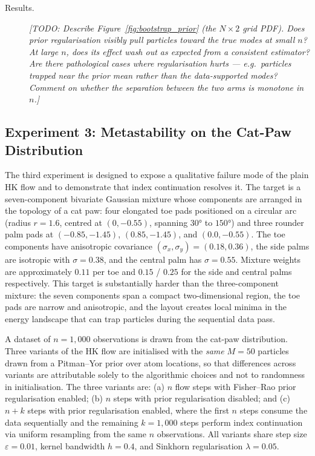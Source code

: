 \begin{description}
  \item[Results.]
  \textit{[TODO: Describe Figure~\ref{fig:bootstrap_prior} (the $N \times 2$ grid PDF).
  Does prior regularisation visibly pull particles toward the true modes at small $n$?
  At large $n$, does its effect wash out as expected from a consistent estimator?
  Are there pathological cases where regularisation hurts --- e.g.\ particles trapped
  near the prior mean rather than the data-supported modes?
  Comment on whether the separation between the two arms is monotone in $n$.]}
\end{description}

\subsection{Experiment 3: Metastability on the Cat-Paw Distribution}
\label{subsec:exp3}

The third experiment is designed to expose a qualitative failure mode of the plain HK flow
and to demonstrate that index continuation resolves it.
The target is a seven-component bivariate Gaussian mixture whose components are arranged in
the topology of a cat paw: four elongated toe pads positioned on a circular arc (radius
$r = 1.6$, centred at $(0, -0.55)$, spanning $30°$ to $150°$) and three rounder palm
pads at $(-0.85, -1.45)$, $(0.85, -1.45)$, and $(0.0, -0.55)$.
The toe components have anisotropic covariance $(\sigma_x, \sigma_y) = (0.18, 0.36)$,
the side palms are isotropic with $\sigma = 0.38$, and the central palm has $\sigma = 0.55$.
Mixture weights are approximately $0.11$ per toe and $0.15$ / $0.25$ for the side and
central palms respectively.
This target is substantially harder than the three-component mixture: the seven components
span a compact two-dimensional region, the toe pads are narrow and anisotropic, and
the layout creates local minima in the energy landscape that can trap particles during
the sequential data pass.

A dataset of $n = 1{,}000$ observations is drawn from the cat-paw distribution.
Three variants of the HK flow are initialised with the \emph{same} $M = 50$ particles drawn
from a Pitman--Yor prior over atom locations, so that differences across variants are
attributable solely to the algorithmic choices and not to randomness in initialisation.
The three variants are:
(a) $n$ flow steps with Fisher--Rao prior regularisation enabled;
(b) $n$ steps with prior regularisation disabled; and
(c) $n + k$ steps with prior regularisation enabled, where the first $n$ steps consume the
data sequentially and the remaining $k = 1{,}000$ steps perform index continuation via
uniform resampling from the same $n$ observations.
All variants share step size $\varepsilon = 0.01$, kernel bandwidth $h = 0.4$, and Sinkhorn
regularisation $\lambda = 0.05$.


